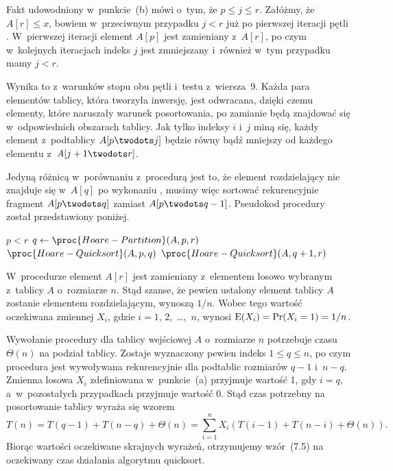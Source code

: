 \subproblem %

\noindent Fakt udowodniony w~punkcie~(b) mówi o~tym, że $p\le j\le r$. Załóżmy, że $A[r]\le x$, bowiem w~przeciwnym przypadku $j<r$ już po pierwszej iteracji pętli . W~pierwszej iteracji element $A[p]$ jest zamieniany z~$A[r]$, po czym w~kolejnych iteracjach indeks $j$ jest zmniejszany i~również w~tym przypadku mamy $j<r$.

\subproblem %
Wynika to z~warunków stopu obu pętli  i~testu z~wiersza~9. Każda para elementów tablicy, która tworzyła inwersję, jest odwracana, dzięki czemu elementy, które naruszały warunek posortowania, po zamianie będą znajdować się w~odpowiednich obszarach tablicy. Jak tylko indeksy $i$ i~$j$ miną się, każdy element z~podtablicy $A[p\twodots j]$ będzie równy bądź mniejszy od każdego elementu z~$A[j+1\twodots r]$.

\subproblem %
Jedyną różnicą w~porównaniu z~procedurą  jest to, że element rozdzielający nie znajduje się w~$A[q]$ po wykonaniu , musimy więc sortować rekurencyjnie fragment $A[p\twodots q]$ zamiast $A[p\twodots q-1]$. Pseudokod procedury został przedstawiony poniżej.
\begin{codebox}
\li	\If $p<r$
\li		\Then
			$q\gets\proc{Hoare-Partition}(A,p,r)$
\li			$\proc{Hoare-Quicksort}(A,p,q)$
\li			$\proc{Hoare-Quicksort}(A,q+1,r)$
		\End
\end{codebox}


\subproblem %
W~procedurze  element $A[r]$ jest zamieniany z~elementem losowo wybranym z~tablicy $A$ o~rozmiarze $n$. Stąd szanse, że pewien ustalony element tablicy $A$ zostanie elementem rozdzielającym, wynoszą $1/n$. Wobec tego wartość oczekiwana zmiennej $X_i$, gdzie $i=1$, 2,~\dots,~$n$, wynosi $\operatorname{E}(X_i)=\Pr(X_i=1)=1/n$.

\subproblem %
Wywołanie procedury  dla tablicy wejściowej $A$ o~rozmiarze $n$ potrzebuje czasu $\Theta(n)$ na podział tablicy. Zostaje wyznaczony pewien indeks $1\le q\le n$, po czym procedura jest wywoływana rekurencyjnie dla podtablic rozmiarów $q-1$ i~$n-q$. Zmienna losowa $X_i$ zdefiniowana w~punkcie~(a) przyjmuje wartość 1, gdy $i=q$, a~w~pozostałych przypadkach przyjmuje wartość 0. Stąd czas potrzebny na posortowanie  tablicy wyraża się wzorem
\[
	T(n) = T(q-1)+T(n-q)+\Theta(n) = \sum_{i=1}^nX_i(T(i-1)+T(n-i)+\Theta(n)).
\]
Biorąc wartości oczekiwane skrajnych wyrażeń, otrzymujemy wzór~(7.5) na oczekiwany czas działania algorytmu quicksort.

